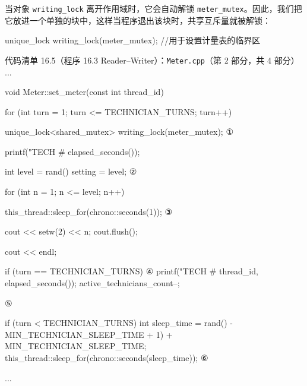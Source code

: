 当对象 \texttt{writing\_\allowbreak{}lock} 离开作用域时，它会自动解锁 \texttt{meter\_\allowbreak{}mutex}。因此，我们把它放进一个单独的块中，这样当程序退出该块时，共享互斥量就被解锁：

\begin{codebox}
{
    unique_lock writing_lock(meter_mutex);
    {
        //用于设置计量表的临界区
    }
}
\end{codebox}


\begin{codeboxt}{代码清单 16.5（程序 16.3 Reader–Writer）：\texttt{Meter.cpp}（第 2 部分，共 4 部分）}
...

void Meter::set_meter(const int thread_id)
{
    for (int turn = 1; turn <= TECHNICIAN_TURNS; turn++)
    {
        {
            unique_lock<shared_mutex> writing_lock(meter_mutex);    ①
            {
                printf("TECH #%
                                          elapsed_seconds());

                    int level = rand()%
                    setting = level;                                ②

                    for (int n = 1; n <= level; n++)
                    {
                        this_thread::sleep_for(chrono::seconds(1)); ③

                        cout << setw(2) << n;
                        cout.flush();
                    }
                    cout << endl;

                if (turn == TECHNICIAN_TURNS)                       ④
                {
                    printf("TECH #%
                           thread_id, elapsed_seconds());
                    active_technicians_count--;
                }
            }
        }                                                           ⑤

        if (turn < TECHNICIAN_TURNS)
        {
            int sleep_time =
                    rand()%
                            - MIN_TECHNICIAN_SLEEP_TIME + 1)
                    + MIN_TECHNICIAN_SLEEP_TIME;
            this_thread::sleep_for(chrono::seconds(sleep_time));    ⑥
        }
    }
}
...
\end{codeboxt}
\par
{}\par
{}\par
{}\par
{}\par
{}\par

